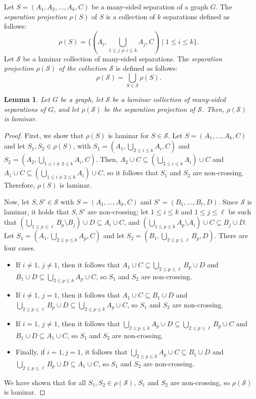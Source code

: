 \documentclass[12pt]{amsart}
\renewcommand{\S}{\mathcal{S}}
\newtheorem{lemma}{Lemma}
\begin{document}
Let $S = (A_1, A_2, \hdots, A_k, C)$ be a many-sided separation of a graph $G$. The {\em separation projection} $\rho(S)$ of $S$ is a collection of $k$ separations defined as follows: $$\rho(S) = \{(A_i, \bigcup_{1 \leq j \neq i \leq k} A_j, C) \mid 1 \leq i \leq k\}.$$ Let $\S$ be a laminar collection of many-sided separations. The {\em separation projection $\rho(\S)$ of the collection $\S$} is defined as follows:
$$\rho(\S) = \bigcup_{S \in \S} \rho(S).$$
\begin{lemma}
Let $G$ be a graph, let $\S$ be a laminar collection of many-sided separations of $G$, and let $\rho(\S)$ be the separation projection of $\S$. Then, $\rho(\S)$ is laminar.
\end{lemma}
\begin{proof}
First, we show that $\rho(S)$ is laminar for $S \in \S$. Let $S = (A_1, \hdots, A_k, C)$ and let $S_1, S_2 \in \rho(S)$, with $S_1 = (A_1, \bigcup_{2 \leq i \leq k} A_i, C)$ and $S_2 = (A_2, \bigcup_{1 \leq i \neq 2 \leq k} A_i, C)$. Then, $A_2 \cup C \subseteq \left(\bigcup_{2 \leq i \leq k} A_i\right) \cup C$ and $A_1 \cup C \subseteq \left(\bigcup_{1 \leq i \neq 2 \leq k} A_i\right) \cup C$, so it follows that $S_1$ and $S_2$ are non-crossing. Therefore, $\rho(S)$ is laminar.

Now, let $S, S' \in \S$ with $S = (A_1, \hdots, A_k, C)$ and $S' = (B_1, \hdots, B_\ell, D)$. Since $\S$ is laminar, it holds that $S, S'$ are non-crossing; let $1 \leq i \leq k$ and $1 \leq j \leq \ell$ be such that $\left(\bigcup_{1 \leq p \leq \ell} B_p \setminus B_j\right) \cup D \subseteq A_i \cup C$, and  $\left(\bigcup_{1 \leq p \leq k} A_p \setminus A_i\right) \cup C \subseteq B_j \cup D$. Let $S_1 = (A_1, \bigcup_{2 \leq p \leq k} A_p, C)$ and let $S_2 = (B_1, \bigcup_{2 \leq p \leq \ell} B_p, D)$. There are four cases.
\begin{itemize}
\item If $i \neq 1$, $j \neq 1$, then it follows that $A_1 \cup C \subseteq \bigcup_{2 \leq p \leq \ell} B_p \cup D$ and $B_1 \cup D \subseteq \bigcup_{2 \leq p \leq k} A_p \cup C$, so $S_1$ and $S_2$ are non-crossing.

\item If $i \neq 1$, $j = 1$, then it follows that $A_1 \cup C \subseteq B_1 \cup D$ and $\bigcup_{2 \leq p \leq \ell} B_p \cup D \subseteq \bigcup_{2 \leq p \leq k} A_p \cup C$, so $S_1$ and $S_2$ are non-crossing.

\item If $i =1$, $j \neq 1$, then it follows that $\bigcup_{2 \leq p \leq k} A_p \cup D \subseteq \bigcup_{2 \leq p \leq \ell} B_p \cup C$ and $B_1 \cup D \subseteq A_1 \cup C$, so $S_1$ and $S_2$ are non-crossing.

\item Finally, if $i=1, j=1$, it follows that $\bigcup_{2 \leq p \leq k} A_p \cup C \subseteq B_1 \cup D$ and $\bigcup_{2 \leq p \leq \ell} B_p \cup D \subseteq A_1 \cup C$, so $S_1$ and $S_2$ are non-crossing.
\end{itemize}
We have shown that for all $S_1, S_2 \in \rho(\S)$, $S_1$ and $S_2$ are non-crossing, so $\rho(\S)$ is laminar.
\end{proof}
\end{document}
